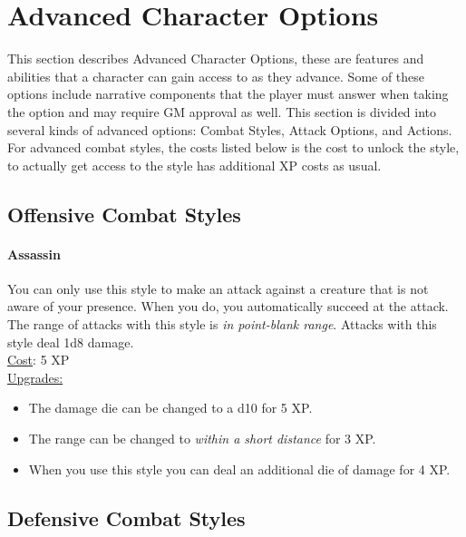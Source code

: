 \section{Advanced Character Options}\label{sec:character-advanced}
This section describes Advanced Character Options, these are features and abilities that a character can gain access to as they advance.
Some of these options include narrative components that the player must answer when taking the option and may require GM approval as well.
This section is divided into several kinds of advanced options: Combat Styles, Attack Options, and Actions.
For advanced combat styles, the costs listed below is the cost to unlock the style, to actually get access to the style has additional XP costs as usual.

\subsection{Offensive Combat Styles}
\paragraph{Assassin}
You can only use this style to make an attack against a creature that is not aware of your presence.
When you do, you automatically succeed at the attack.
The range of attacks with this style is \emph{in point-blank range}.
Attacks with this style deal 1d8 damage.
\\[.5cm]
\underline{Cost}: 5 XP
\\
\underline{Upgrades:}
\begin{itemize}
  \item[-] The damage die can be changed to a d10 for 5 XP.
  \item[-] The range can be changed to \emph{within a short distance} for 3 XP.
  \item[-] When you use this style you can deal an additional die of damage for 4 XP.
\end{itemize}

\subsection{Defensive Combat Styles}
